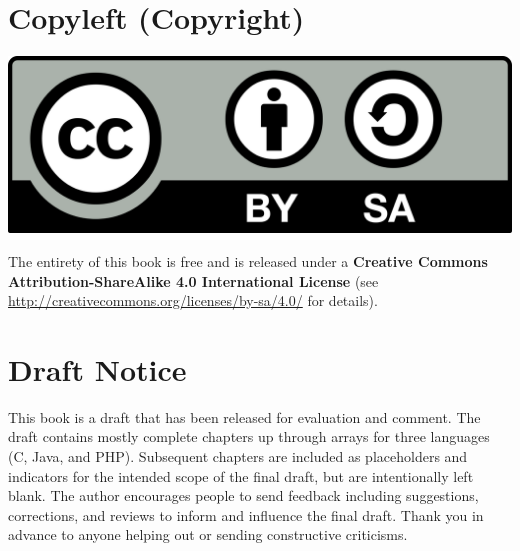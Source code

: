 \documentclass[12pt]{scrbook}
\begin{document}


\frontmatter

\chapter{Copyleft (Copyright)}

\includegraphics[scale=0.10]{images/CC-BY-SA_icon-large.png} 

The entirety of this book is free and is released under a \textbf{Creative Commons Attribution-ShareAlike 
4.0 International License} (see \url{http://creativecommons.org/licenses/by-sa/4.0/} for details).

\chapter{Draft Notice}

This book is a draft that has been released for evaluation and comment.  The
draft contains mostly complete chapters up through arrays 
for three languages (C, Java, and PHP).  Subsequent chapters are included as
placeholders and indicators for the intended scope of the final draft, but are intentionally
left blank.  The author encourages people to send feedback including suggestions, 
corrections, and reviews to inform and influence the final draft.  Thank you in advance
to anyone helping out or sending constructive criticisms.
\end{document}
